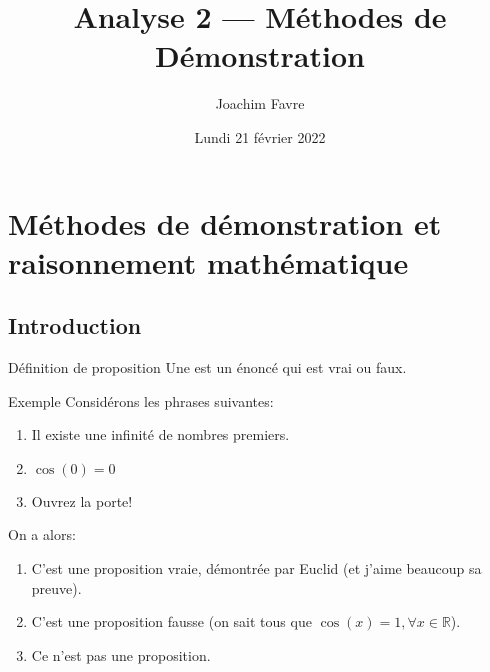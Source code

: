 \documentclass[a4paper]{article}
\title{Analyse 2 --- Méthodes de Démonstration}
\author{Joachim Favre}
\date{Lundi 21 février 2022}
\begin{document}
\maketitle


\section[Méthodes de démonstration]{Méthodes de démonstration et raisonnement mathématique}
\subsection{Introduction}
\begin{parag}{Définition de proposition}
    Une  est un énoncé qui est vrai ou faux.

    \begin{subparag}{Exemple}
        Considérons les phrases suivantes:
        \begin{enumerate}
            \item Il existe une infinité de nombres premiers.
            \item $\displaystyle \cos\left(0\right) = 0$
            \item Ouvrez la porte!
        \end{enumerate}

        On a alors:
        \begin{enumerate}
            \item C'est une proposition vraie, démontrée par Euclid (et j'aime beaucoup sa preuve).
            \item C'est une proposition fausse (on sait tous que $\cos\left(x\right) = 1, \forall x \in \mathbb{R}$).
            \item Ce n'est pas une proposition.
        \end{enumerate}
    \end{subparag}
\end{parag}
\end{document}
